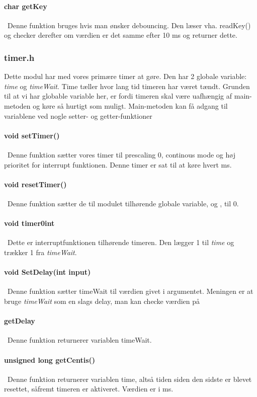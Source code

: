 \paragraph{char getKey}\
Denne funktion bruges hvis man ønsker debouncing. Den læser vha. readKey() og checker derefter om værdien er det samme efter 10 ms og returner dette.
\subsubsection{timer.h}
Dette modul har med vores primære timer at gøre. Den har 2 globale variable: \textit{time} og \textit{timeWait}. Time tæller hvor lang tid timeren har været tændt. Grunden til at vi har globable variable her, er fordi timeren skal være uafhængig af main-metoden og køre så hurtigt som muligt. Main-metoden kan få adgang til variablene ved nogle setter- og getter-funktioner
\paragraph{void setTimer()}\
Denne funktion sætter vores timer til prescaling 0, continous mode og høj prioritet for interrupt funktionen. Denne timer er sat til at køre hvert ms.
\paragraph{void resetTimer()}\
Denne funktion sætter de til modulet tilhørende globale variable,  og , til 0.
\paragraph{void timer0int}\
Dette er interruptfunktionen tilhørende timeren. Den lægger 1 til \textit{time} og trækker 1 fra \textit{timeWait}. 
\paragraph{void SetDelay(int input)}\
Denne funktion sætter timeWait til værdien givet i argumentet. Meningen er at bruge \textit{timeWait} som en slags delay, man kan checke værdien på
\paragraph{getDelay}\
Denne funktion returnerer variablen timeWait.
\paragraph{unsigned long getCentis()}\
Denne funktion returnerer variablen time, altså tiden siden den sidste er blevet resettet, såfremt timeren er aktiveret. Værdien er i ms.

